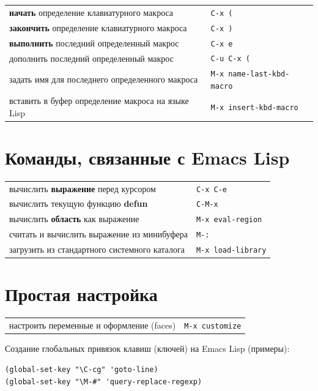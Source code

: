 \documentclass[10pt]{article}
\newlength{\ColWidth}
\newcommand{\kbd}[1]{\texttt{#1}}
\begin{document}
\begin{tabular}{p{\ColWidth}l}
{\bf начать} определение клавиатурного макроса & \kbd{C-x (} \\
{\bf закончить} определение клавиатурного макроса & \kbd{C-x )} \\
{\bf выполнить} последний определенный макрос & \kbd{C-x e} \\
дополнить последний определенный макрос & \kbd{C-u C-x (} \\
задать имя для последнего определенного макроса & \kbd{M-x name-last-kbd-macro} \\
вставить в буфер определение макроса на языке Lisp & \kbd{M-x insert-kbd-macro} \\
\end{tabular}

\section{Команды, связанные с Emacs Lisp}

\begin{tabular}{p{\ColWidth}l}
вычислить {\bf выражение} перед курсором & \kbd{C-x C-e} \\
вычислить текущую функцию {\bf defun} & \kbd{C-M-x} \\
вычислить {\bf область} как выражение & \kbd{M-x eval-region} \\
считать и вычислить выражение из минибуфера & \kbd{M-:} \\
загрузить из стандартного системного каталога & \kbd{M-x load-library} \\
\end{tabular}

\section{Простая настройка}

\begin{tabular}{p{\ColWidth}l}
настроить переменные и оформление (faces) & \kbd{M-x customize} \\
\end{tabular}


Создание глобальных привязок клавиш (ключей) на Emacs Lisp (примеры):

\begin{verbatim}
(global-set-key "\C-cg" 'goto-line)
(global-set-key "\M-#" 'query-replace-regexp)
\end{verbatim}
\end{document}
